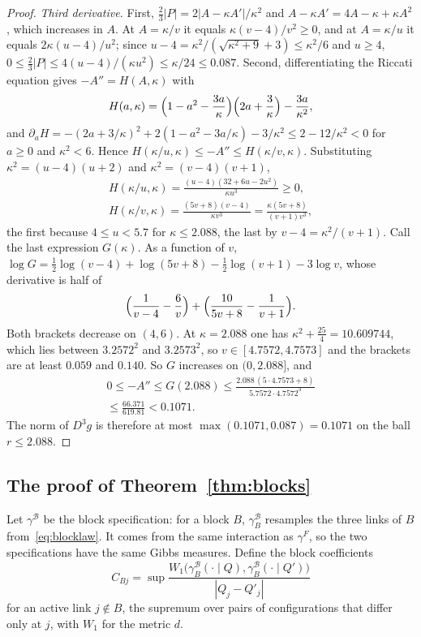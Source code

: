 \documentclass[aps,prd,twocolumn,superscriptaddress,nofootinbib,longbibliography,floatfix,amsmath,amssymb,10pt]{revtex4-2}
\theoremstyle{definition}
\theoremstyle{remark}
\begin{document}
\begin{proof}
\emph{Third derivative.} First, $\frac23|P|=2|A-\kappa A'|/\kappa^2$ and
$A-\kappa A'=4A-\kappa+\kappa A^2$, which increases in $A$. At $A=\kappa/v$
it equals $\kappa(v-4)/v^2\ge0$, and at $A=\kappa/u$ it equals
$2\kappa(u-4)/u^2$; since $u-4=\kappa^2/(\sqrt{\kappa^2+9}+3)\le\kappa^2/6$
and $u\ge4$, $0\le\frac23|P|\le4(u-4)/(\kappa u^2)\le\kappa/24\le0.087$.
Second, differentiating the Riccati equation gives $-A''=H(A,\kappa)$ with
\[
H(a,\kappa)=\Bigl(1-a^2-\frac{3a}\kappa\Bigr)\Bigl(2a+\frac3\kappa\Bigr)-
\frac{3a}{\kappa^2},
\]
and $\partial_aH=-(2a+3/\kappa)^2+2(1-a^2-3a/\kappa)-3/\kappa^2\le2-12/
\kappa^2<0$ for $a\ge0$ and $\kappa^2<6$. Hence $H(\kappa/u,\kappa)\le-A''
\le H(\kappa/v,\kappa)$. Substituting $\kappa^2=(u-4)(u+2)$ and $\kappa^2=
(v-4)(v+1)$,
\begin{gather*}
H(\kappa/u,\kappa)=\frac{(u-4)(32+6u-2u^2)}{\kappa u^3}\ge0,\\
H(\kappa/v,\kappa)=\frac{(5v+8)(v-4)}{\kappa v^3}=\frac{\kappa(5v+8)}
{(v+1)v^3},
\end{gather*}
the first because $4\le u<5.7$ for $\kappa\le2.088$, the last by
$v-4=\kappa^2/(v+1)$. Call the last expression $G(\kappa)$. As a function
of $v$, $\log G=\frac12\log(v-4)+\log(5v+8)-\frac12\log(v+1)-3\log
v$, whose derivative is half of
\[
\Bigl(\frac1{v-4}-\frac6v\Bigr)+\Bigl(\frac{10}{5v+8}-\frac1{v+1}\Bigr).
\]
Both brackets decrease on $(4,6)$. At $\kappa=2.088$ one has $\kappa^2+
\frac{25}4=10.609744$, which lies between $3.2572^2$ and $3.2573^2$, so
$v\in[4.7572,4.7573]$ and the brackets are at least $0.059$ and $0.140$. So $G$ increases on $(0,2.088]$, and
\begin{multline*}
0\le-A''\le G(2.088)\le\frac{2.088\,(5\cdot4.7573+8)}{5.7572\cdot4.7572^3}\\
\le\frac{66.371}{619.81}<0.1071 .
\end{multline*}
The norm of $D^3g$ is therefore at most $\max(0.1071,0.087)=0.1071$ on the
ball $r\le2.088$.
\end{proof}

\subsection{The proof of Theorem~\ref{thm:blocks}}

Let $\gamma^{\mathcal B}$ be the block specification: for a block $B$,
$\gamma^{\mathcal B}_B$ resamples the three links of $B$ from~\eqref{eq:blocklaw}.
It comes from the same interaction as $\gamma^F$, so the two specifications
have the same Gibbs measures. Define the block coefficients
\[
C_{Bj}=\sup\frac{W_1\bigl(\gamma^{\mathcal B}_B(\cdot\mid Q),\gamma^{\mathcal B}_B
(\cdot\mid Q')\bigr)}{|Q_j-Q'_j|}
\]
for an active link $j\notin B$, the supremum over pairs of configurations
that differ only at $j$, with $W_1$ for the metric $d$.
\end{document}
